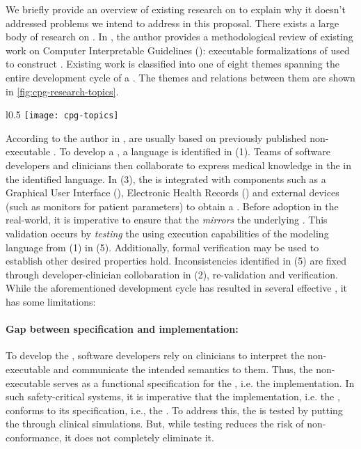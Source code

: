 We briefly provide an overview of existing research on \CDSSs{} to explain why
it doesn't addressed problems we intend to address in this proposal.
There exists a large body of research on \CDSSs{}. In
\cite{PelegJBI13}, the author provides a methodological review of
existing work on Computer Interpretable Guidelines (\CIGs{}): executable
formalizations of \BPGs{} used to construct \CDSSs{}.
Existing work is classified into one of eight themes spanning
the entire development cycle of a \CIG{}. The themes and relations between them
are shown in \figurename{} \ref{fig:cpg-research-topics}.

\begin{wrapfigure}{l}{0.5\textwidth}
  \texttt{[image: cpg-topics]}
  \caption{\CDSSs{} Research Themes}\label{fig:cpg-research-topics}
\end{wrapfigure}

According to the author in \cite{PelegJBI13}, \CIGs{} are usually based on previously published non-executable
\BPGs{}. To develop a \CIG{}, a language is identified in (1). Teams of
software developers and clinicians then collaborate to express medical knowledge
in the \BPG{} in the identified language. In (3), the \CIG{}
is integrated with components such as a Graphical User
Interface (\GUI{}), Electronic Health Records (\EHRs{}) and external devices
(such as monitors for patient parameters) to obtain a \CDSS. Before adoption
in the real-world, it is imperative to ensure that the \CIG{} \emph{mirrors}
the underlying \BPG{}. This validation occurs by \emph{testing} the \CDSS{}
using execution capabilities of the modeling language from (1) in (5).
Additionally, formal verification may be used to establish other desired
properties hold. Inconsistencies identified in (5) are fixed through developer-clinician
collobaration in (2),  re-validation and
verification. While the aforementioned development cycle has resulted in several
effective \CDSSs{}, it has some limitations:

\paragraph{Gap between specification and implementation:}

To develop the \CIG{}, software developers rely on clinicians to interpret the
non-executable \BPG{} and communicate
the intended semantics to them. Thus, the non-executable \BPG{} serves as a functional specification for
the \CIG{}, i.e. the implementation. In such safety-critical systems, it is
imperative that the implementation, i.e. the \CIG{}, conforms to its
specification, i.e., the \BPG{}. To address this, the \CIG{} is tested by
putting the \CDSS{} through clinical simulations. But, while testing reduces
the risk of non-conformance, it does not completely eliminate it.

